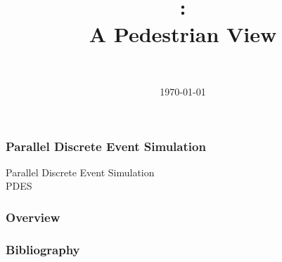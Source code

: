 \documentclass[]{beamer}
\title
[\pdes]
{\pdes:\\A Pedestrian View}
\author[Daniel Topa]{\Topa \\ \TopaEmail}
\institute{\unmmath}
\date{\today}
\begin{document}


\begin{frame}
	\titlepage
\end{frame}
	
\begin{frame}\frametitle{Parallel Discrete Event Simulation}
\center
	Parallel Discrete Event Simulation \\[20pt]
	PDES
\end{frame}


\begin{frame}\frametitle{Overview}
	\tableofcontents[hideallsubsections]
\end{frame}

	
	
	
%	
	

{\tiny{
\begin{frame}[allowframebreaks]\frametitle{Bibliography}
	\printbibliography
\end{frame}}}

\begin{frame}
	\titlepage
\end{frame}
\end{document}
